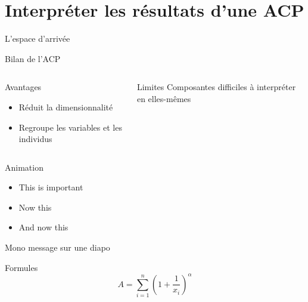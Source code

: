 \documentclass{beamer}
\begin{document}
\section{Interpréter les résultats d'une ACP}

\begin{frame}{L'espace d'arrivée}


\end{frame}








\begin{frame}{Bilan de l'ACP}


  \begin{columns}[T,onlytextwidth]
        \begin{alertblock}{Avantages}
        	\begin{itemize}
        		\item Réduit la dimensionnalité
        		\item Regroupe les variables et les individus 
        	\end{itemize}
      	\end{alertblock}

    
      \begin{block}{Limites}
        Composantes difficiles à interpréter en elles-mêmes
      \end{block}

      
  \end{columns}
\end{frame}




\begin{frame}
\end{frame}




\begin{frame}{Animation}
  \begin{itemize}[<+- | alert@+>]
    \item \alert<4>{This is important}
    \item Now this
    \item And now this
  \end{itemize}
\end{frame}



\begin{frame}[standout]
Mono message sur une diapo
\end{frame}


\begin{frame}{Formules}
  \begin{equation*}
    A = \sum_{i=1}^{n} \left(1 + \frac{1}{x_i}\right)^{\alpha}
  \end{equation*}
\end{frame}
\end{document}
